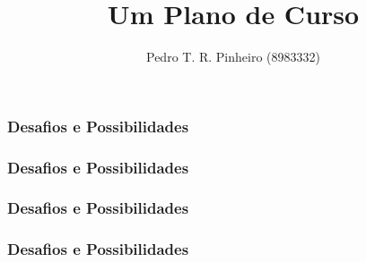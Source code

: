 \documentclass[12pt]{beamer}
\begin{document}
	\author{Pedro T. R. Pinheiro (8983332)}
	\title{Um Plano de Curso}
	\begin{frame}[plain]
	\maketitle
\end{frame}

\begin{frame}
\frametitle{Desafios e Possibilidades}

\end{frame}

\begin{frame}
\frametitle{Desafios e Possibilidades}

\end{frame}

\begin{frame}
\frametitle{Desafios e Possibilidades}

\end{frame}

\begin{frame}
\frametitle{Desafios e Possibilidades}

\end{frame}
\end{document}
